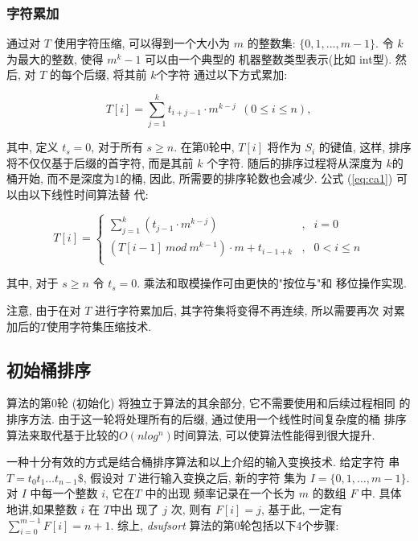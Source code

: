 \documentclass{ws-ijprai}
\begin{document}
\subsubsection{字符累加}

通过对 $T$ 使用字符压缩, 可以得到一个大小为 $m$ 的整数集:
$\{0,1,\dots,m-1\}$. 令 $k$ 为最大的整数, 使得 $m^k-1$ 可以由一个典型的
机器整数类型表示(比如 int型). 然后, 对 $T$ 的每个后缀, 将其前 $k$个字符
通过以下方式累加:

\begin{equation}\label{eq:ca1}
  T[i] = \sum_{j=1}^k t_{i+j-1} \cdot m^{k-j}  ~~(0 \leq i \leq n),
\end{equation}

\noindent 其中, 定义 $t_s = 0$, 对于所有 $s \geq n$. 在第0轮中, $T[i]$
将作为 $S_i$ 的键值, 这样, 排序将不仅仅基于后缀的首字符, 而是其前 $k$
个字符. 随后的排序过程将从深度为 $k$的桶开始, 而不是深度为1的桶, 因此,
所需要的排序轮数也会减少. 公式 (\ref{eq:ca1}) 可以由以下线性时间算法替
代:

\begin{equation}\label{eq:ca2}
 T[i]  = \left\{
  \begin{array}{lll}
    \sum_{j=1}^{k}(t_{j-1} \cdot m^{k-j})  &,  &  i = 0\\
    (T[i-1]~ mod~m^{k-1}) \cdot m + t_{i-1+k} &,  & 0 < i \leq n \\
    \end{array}\right.
\end{equation}

\par\noindent
其中, 对于 $s \geq n$ 令 $t_s = 0$. 乘法和取模操作可由更快的"按位与"和
移位操作实现.

注意, 由于在对 $T$ 进行字符累加后, 其字符集将变得不再连续, 所以需要再次
对累加后的$T$使用字符集压缩技术.

\subsection{初始桶排序}

算法的第0轮 (初始化) 将独立于算法的其余部分, 它不需要使用和后续过程相同
的排序方法. 由于这一轮将处理所有的后缀, 通过使用一个线性时间复杂度的桶
排序算法来取代基于比较的$O(nlog^n)$时间算法, 可以使算法性能得到很大提升.

一种十分有效的方式是结合桶排序算法和以上介绍的输入变换技术. 给定字符
串 $T = t_0t_1 \dots t_{n-1}\$$, 假设对 $T$ 进行输入变换之后, 新的字符
集为 $I = \{0,1,\dots,m-1\}$. 对 $I$ 中每一个整数 $i$, 它在$T$ 中的出现
频率记录在一个长为 $m$ 的数组 $F$ 中. 具体地讲,如果整数 $i$ 在 $T$中出
现了 $j$ 次, 则有 $F[i] = j$, 基于此, 一定有 $\sum_{i=0}^{m-1} F[i] =
n + 1$. 综上, \emph{dsufsort} 算法的第0轮包括以下4个步骤:
\end{document}

